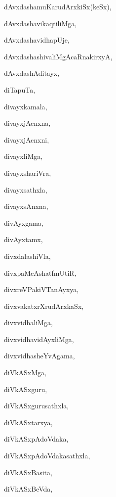 \begin{multicols}{2}
{dAvxdashamuKarudArxkiSx(keSx)}, \pageref{dAvxdashamuKarudArxkiSxkeSx}

{dAvxdashavikaqtiliMga}, \pageref{dAvxdashavikaqtiliMga}

{dAvxdashavidhapUje}, \pageref{dAvxdashavidhapUje}

{dAvxdashashivaliMgAcaRnakirxyA}, \pageref{dAvxdashashivaliMgAcaRnakirxyA}

{dAvxdashAditayx}, \pageref{dAvxdashAditayx}

{diTapuTa}, \pageref{diTapuTa}

{divayxkamala}, \pageref{divayxkamala}

{divayxjAcnxna}, \pageref{divayxjAcnxna}

{divayxjAcnxni}, \pageref{divayxjAcnxni}

{divayxliMga}, \pageref{divayxliMga}

{divayxshariVra}, \pageref{divayxshariVra}

{divayxsathxla}, \pageref{divayxsathxla}

{divayxsAnxna}, \pageref{divayxsAnxna}

{divAyxgama}, \pageref{divAyxgama}

{divAyxtamx}, \pageref{divAyxtamx}

{divxdalashiVla}, \pageref{divxdalashiVla}

{divxpaMcAshatfmUtiR}, \pageref{divxpaMcAshatfmUtiR}

{divxreVPakiVTanAyxya}, \pageref{divxreVPakiVTanAyxya}

{divxvakatxrXrudArxkaSx}, \pageref{divxvakatxrXrudArxkaSx}

{divxvidhaliMga}, \pageref{divxvidhaliMga}

{divxvidhavidAyxliMga}, \pageref{divxvidhavidAyxliMga}

{divxvidhasheYvAgama}, \pageref{divxvidhasheYvAgama}

{diVkASxMga}, \pageref{diVkASxMga}

{diVkASxguru}, \pageref{diVkASxguru}

{diVkASxgurusathxla}, \pageref{diVkASxgurusathxla}

{diVkASxtarxya}, \pageref{diVkASxtarxya}

{diVkASxpAdoVdaka}, \pageref{diVkASxpAdoVdaka}

{diVkASxpAdoVdakasathxla}, \pageref{diVkASxpAdoVdakasathxla}

{diVkASxBasita}, \pageref{diVkASxBasita}

{diVkASxBeVda}, \pageref{diVkASxBeVda}


\end{multicols}
